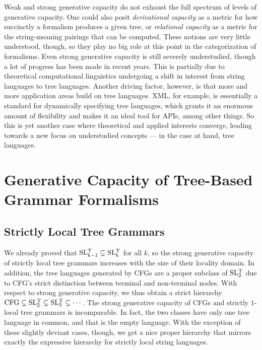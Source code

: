 Weak and strong generative capacity do not exhaust the full spectrum of levels of generative capacity.
One could also posit \emph{derivational capacity} as a metric for how succinctly a formalism produces a given tree, or \emph{relational capacity} as a metric for the string-meaning pairings that can be computed.
These notions are very little understood, though, so they play no big role at this point in the categorization of formalisms.
Even strong generative capacity is still severely understudied, though a lot of progress has been made in recent years.
This is partially due to theoretical computational linguistics undergoing a shift in interest from string languages to tree languages.
Another driving factor, however, is that more and more application areas build on tree languages.
XML, for example, is essentially a standard for dynamically specifying tree languages, which grants it an enormous amount of flexibility and makes it an ideal tool for APIs, among other things.
So this is yet another case where theoretical and applied interests converge, leading towards a new focus on understudied concepts --- in the case at hand, tree languages.

\section{Generative Capacity of Tree-Based Grammar Formalisms}

\subsection{Strictly Local Tree Grammars}

We already proved that $\SLT[k-1] \subsetneq \SLT[k]$ for all $k$, so the strong generative capacity of strictly local tree grammars increases with the size of their locality domain.
In addition, the tree languages generated by CFGs are a proper subclass of $\SLT[2]$ due to CFG's strict distinction between terminal and non-terminal nodes.
With respect to strong generative capacity, we thus obtain a strict hierarchy $\mathrm{CFG} \subsetneq \SLT[2] \subsetneq \SLT[3] \subsetneq \cdots$.
The strong generative capacity of CFGs and strictly $1$-local tree grammars is incomparable.
%
In fact, the two classes have only one tree language in common, and that is the empty language.
With the exception of these slightly deviant cases, though, we get a nice proper hierarchy that mirrors exactly the expressive hierarchy for strictly local string languages.

